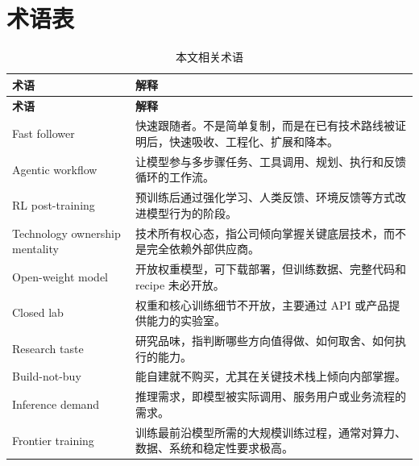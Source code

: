 \section{术语表}

\begin{longtable}{@{}p{3.4cm}p{10cm}@{}}
\caption{本文相关术语}\\
\toprule
\textbf{术语} & \textbf{解释} \\
\midrule
\endfirsthead
\toprule
\textbf{术语} & \textbf{解释} \\
\midrule
\endhead
Fast follower & 快速跟随者。不是简单复制，而是在已有技术路线被证明后，快速吸收、工程化、扩展和降本。 \\
\addlinespace
Agentic workflow & 让模型参与多步骤任务、工具调用、规划、执行和反馈循环的工作流。 \\
\addlinespace
RL post-training & 预训练后通过强化学习、人类反馈、环境反馈等方式改进模型行为的阶段。 \\
\addlinespace
Technology ownership mentality & 技术所有权心态，指公司倾向掌握关键底层技术，而不是完全依赖外部供应商。 \\
\addlinespace
Open-weight model & 开放权重模型，可下载部署，但训练数据、完整代码和 recipe 未必开放。 \\
\addlinespace
Closed lab & 权重和核心训练细节不开放，主要通过 API 或产品提供能力的实验室。 \\
\addlinespace
Research taste & 研究品味，指判断哪些方向值得做、如何取舍、如何执行的能力。 \\
\addlinespace
Build-not-buy & 能自建就不购买，尤其在关键技术栈上倾向内部掌握。 \\
\addlinespace
Inference demand & 推理需求，即模型被实际调用、服务用户或业务流程的需求。 \\
\addlinespace
Frontier training & 训练最前沿模型所需的大规模训练过程，通常对算力、数据、系统和稳定性要求极高。 \\
\bottomrule
\end{longtable}


